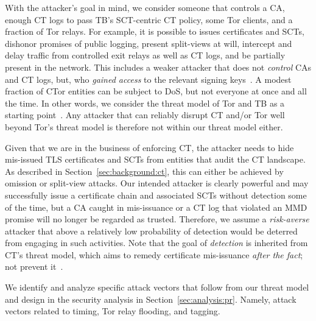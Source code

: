 With
the attacker's goal in mind, we consider someone that controls
	a CA,
	enough CT logs to pass TB's SCT-centric CT policy, 
	some Tor clients, and
	a fraction of Tor relays.
For example, it is possible to
	issues certificates and SCTs,
	dishonor promises of public logging,
	present split-views at will,
	intercept and delay traffic from controlled exit relays as well as CT logs,
		and
	be partially present in the network.
This includes a weaker attacker that does not \emph{control} CAs and CT logs,
but, who \emph{gained access} to the relevant signing keys~\cite{turktrust,%
gdca1-omission}.  A modest fraction of CTor entities can be subject to DoS, but
not everyone at once and all the time.  In other words, we consider the threat
model of Tor and TB as a starting point~\cite{tor,tor-browser}.  Any
attacker that can reliably disrupt CT and/or Tor well beyond Tor's threat
model is therefore not within our threat model either.

%
%
Given that we are in the business of enforcing CT, the attacker needs to hide
mis-issued TLS certificates and SCTs from entities that audit the CT landscape.
As described in Section~\ref{sec:background:ct}, this can either be achieved by
omission or split-view attacks.  Our intended attacker is clearly powerful and
may successfully issue a certificate chain and associated SCTs without detection
some of the time, but a CA caught in mis-issuance or a CT log that violated an
MMD promise will no longer be regarded as trusted.  Therefore, we assume a
\emph{risk-averse} attacker that above a relatively low probability of detection
would be deterred from engaging in such activities. Note that the goal of
\emph{detection} is inherited from CT's threat model, which aims to remedy
certificate mis-issuance \emph{after the fact}; not prevent it~\cite{ct/a}.

%
%
We identify and analyze specific attack vectors that follow from our threat
model and design in the security analysis in Section~\ref{sec:analysis:pr}.
Namely, attack vectors related to timing, Tor relay flooding, and tagging.
        
